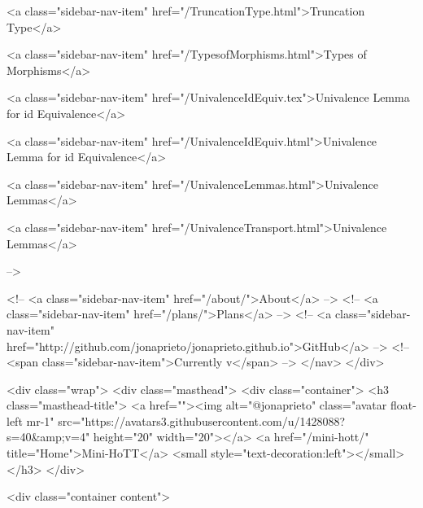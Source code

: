       
    
      
        
          <a class="sidebar-nav-item" href="/TruncationType.html">Truncation Type</a>
        
      
    
      
        
          <a class="sidebar-nav-item" href="/TypesofMorphisms.html">Types of Morphisms</a>
        
      
    
      
        
          <a class="sidebar-nav-item" href="/UnivalenceIdEquiv.tex">Univalence Lemma for id Equivalence</a>
        
      
    
      
        
          <a class="sidebar-nav-item" href="/UnivalenceIdEquiv.html">Univalence Lemma for id Equivalence</a>
        
      
    
      
        
          <a class="sidebar-nav-item" href="/UnivalenceLemmas.html">Univalence Lemmas</a>
        
      
    
      
        
          <a class="sidebar-nav-item" href="/UnivalenceTransport.html">Univalence Lemmas</a>
        
      
     -->

    <!-- <a class="sidebar-nav-item" href="/about/">About</a> -->
    <!-- <a class="sidebar-nav-item" href="/plans/">Plans</a> -->
    <!-- <a class="sidebar-nav-item" href="http://github.com/jonaprieto/jonaprieto.github.io">GitHub</a> -->
    <!-- <span class="sidebar-nav-item">Currently v</span> -->
  </nav>
</div>

    <div class="wrap">
      <div class="masthead">
        <div class="container">
          <h3 class="masthead-title">
            <a href=""><img alt="@jonaprieto" class="avatar float-left mr-1" src="https://avatars3.githubusercontent.com/u/1428088?s=40&amp;v=4" height="20" width="20"></a>
            <a href="/mini-hott/" title="Home">Mini-HoTT</a>
            <small style="text-decoration:left"></small>
          </h3>
        </div>
      
      <div class="container content">
        







